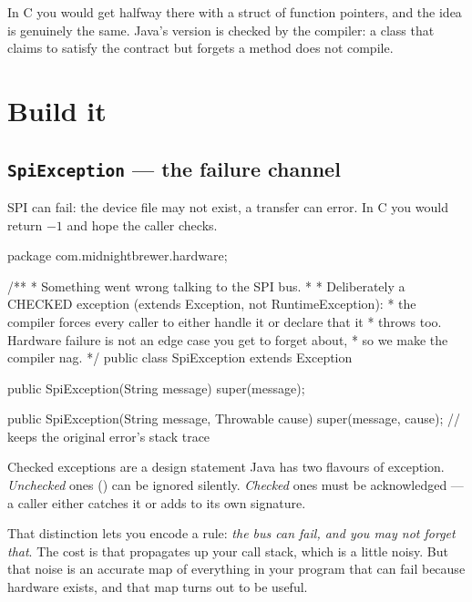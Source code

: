 In C you would get halfway there with a struct of function pointers, and the
idea is genuinely the same. Java's version is checked by the compiler: a class
that claims to satisfy the contract but forgets a method does not compile.

\section{Build it}

\subsection{\texttt{SpiException} --- the failure channel}

SPI can fail: the device file may not exist, a transfer can error. In C you
would return $-1$ and hope the caller checks.

\begin{jcode}
package com.midnightbrewer.hardware;

/**
 * Something went wrong talking to the SPI bus.
 *
 * Deliberately a CHECKED exception (extends Exception, not RuntimeException):
 * the compiler forces every caller to either handle it or declare that it
 * throws too. Hardware failure is not an edge case you get to forget about,
 * so we make the compiler nag.
 */
public class SpiException extends Exception {

    public SpiException(String message) {
        super(message);
    }

    public SpiException(String message, Throwable cause) {
        super(message, cause);   // keeps the original error's stack trace
    }
}
\end{jcode}

\begin{concept}{Checked exceptions are a design statement}
Java has two flavours of exception. \emph{Unchecked} ones
() can be ignored silently. \emph{Checked} ones must be
acknowledged --- a caller either catches it or adds  to
its own signature.

That distinction lets you encode a rule: \emph{the bus can fail, and you may not
forget that}. The cost is that  propagates up your call
stack, which is a little noisy. But that noise is an accurate map of everything
in your program that can fail because hardware exists, and that map turns out to
be useful.
\end{concept}

